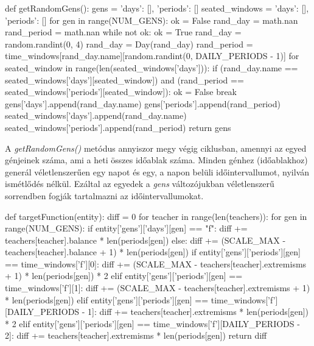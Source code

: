 \documentclass[a4paper,12pt]{article}
\begin{document}
\begin{python}
def getRandomGens():
    gens = {'days': [], 'periods': []}
    seated_windows = {'days': [], 'periods': []}
    for gen in range(NUM_GENS):
        ok = False
        rand_day = math.nan
        rand_period = math.nan
        while not ok:
            ok = True
            rand_day = random.randint(0, 4)
            rand_day = Day(rand_day)
            rand_period = time_windows[rand_day.name][random.randint(0, DAILY_PERIODS - 1)]
            for seated_window in range(len(seated_windows['days'])):
                if (rand_day.name == seated_windows['days'][seated_window]) and (rand_period == seated_windows['periods'][seated_window]):
                    ok = False
                    break
        gens['days'].append(rand_day.name)
        gens['periods'].append(rand_period)
        seated_windows['days'].append(rand_day.name)
        seated_windows['periods'].append(rand_period)
    return gens
\end{python}

A \textsl{getRandomGens()} metódus annyiszor megy végig ciklusban, amennyi az egyed génjeinek száma, ami a heti összes időablak száma. Minden génhez (időablakhoz) generál véletlenszerűen egy napot és egy, a napon belüli időintervallumot, nyilván ismétlődés nélkül. Ezáltal az egyedek a \textsl{gens} változójukban véletlenszerű sorrendben fogják tartalmazni az időintervallumokat.

\begin{python}
def targetFunction(entity):
    diff = 0
    for teacher in range(len(teachers)):
        for gen in range(NUM_GENS):
            if entity['gens']['days'][gen] == "f":
                diff += teachers[teacher].balance * len(periods[gen])
            else:
                diff += (SCALE_MAX - teachers[teacher].balance + 1) * len(periods[gen])
            if entity['gens']['periods'][gen] == time_windows['f'][0]:
                diff += (SCALE_MAX - teachers[teacher].extremisms + 1) * len(periods[gen]) * 2
            elif entity['gens']['periods'][gen] == time_windows['f'][1]:
                diff += (SCALE_MAX - teachers[teacher].extremisms + 1) * len(periods[gen])
            elif entity['gens']['periods'][gen] == time_windows['f'][DAILY_PERIODS - 1]:
                diff += teachers[teacher].extremisms * len(periods[gen]) * 2
            elif entity['gens']['periods'][gen] == time_windows['f'][DAILY_PERIODS - 2]:
                diff += teachers[teacher].extremisms * len(periods[gen])
    return diff
\end{python}
\end{document}
